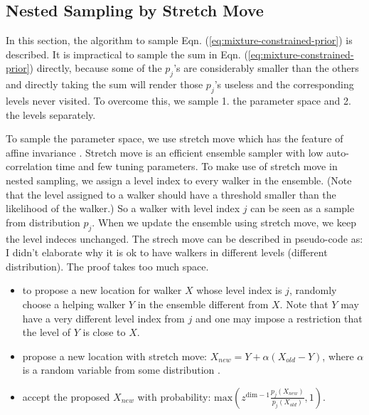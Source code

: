 \documentclass[letterpaper, preprint]{aastex}
\newcommand{\qer}[1]{{\color{red}#1}}
\begin{document}
\subsection{Nested Sampling by Stretch Move}
\label{sec:algorithm}
In this section, the algorithm to sample Eqn. (\ref{eq:mixture-constrained-prior}) is described. It is impractical to sample the sum in Eqn. (\ref{eq:mixture-constrained-prior}) directly, because some of the $p_{j}$'s are considerably smaller than the others and directly taking the sum will render those $p_{j}$'s useless and the corresponding levels never visited. To overcome this, we sample 1. the parameter space and 2. the levels separately. 

To sample the parameter space, we use stretch move which has the feature of affine invariance \citep{goodman10a}. Stretch move is an efficient ensemble sampler with low auto-correlation time and few tuning parameters. To make use of stretch move in nested sampling, we assign a level index to every walker in the ensemble. (Note that the level assigned to a walker should have a threshold smaller than the likelihood of the walker.) So a walker with level index $j$ can be seen as a sample from distribution $p_j$. When we update the ensemble using stretch move, we keep the level indeces unchanged. The strech move can be described in pseudo-code as:
\qer{I didn't elaborate why it is ok to have walkers in different levels (different distribution). The proof takes too much space.}
\begin{sffamily}
\begin{itemize}
\item to propose a new location for walker $X$ whose level index is $j$, randomly choose a helping walker $Y$ in the ensemble different from $X$. Note that $Y$ may have a very different level index from $j$ and one may impose a restriction that the level of $Y$ is close to $X$.
\item propose a new location with stretch move: $X_{new} = Y + \alpha (X_{old}-Y)$, where $\alpha$ is a random variable from some distribution \citep{goodman10a}.
\item accept the proposed $X_{new}$ with probability: $\mathrm{max}\left(z^{\mathrm{dim}-1}\frac{p_{j}(X_{new})}{p_{j}(X_{old})},1\right)$. 
\end{itemize}
\end{sffamily}
\end{document}
